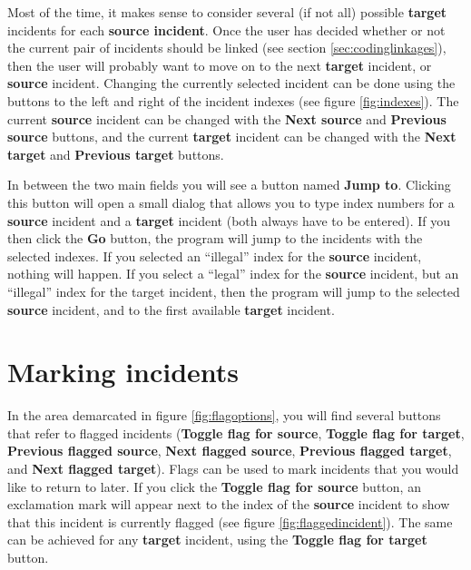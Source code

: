 \documentclass{memoir}
\begin{document}
Most of the time, it makes sense to consider several (if not all) possible \textbf{target} incidents for each \textbf{source incident}. Once the user has decided whether or not the current pair of incidents should be linked (see section \ref{sec:codinglinkages}), then the user will probably want to move on to the next \textbf{target} incident, or \textbf{source} incident. Changing the currently selected incident can be done using the buttons to the left and right of the incident indexes (see figure \ref{fig:indexes}). The current \textbf{source} incident can be changed with the \textbf{Next source} and \textbf{Previous source} buttons, and the current \textbf{target} incident can be changed with the \textbf{Next target} and \textbf{Previous target} buttons.

In between the two main fields you will see a button named \textbf{Jump to}. Clicking this button will open a small dialog that allows you to type index numbers for a \textbf{source} incident and a \textbf{target} incident (both always have to be entered). If you then click the \textbf{Go} button, the program will jump to the incidents with the selected indexes. If you selected an ``illegal'' index for the \textbf{source} incident, nothing will happen. If you select a ``legal'' index for the \textbf{source} incident, but an ``illegal'' index for the target incident, then the program will jump to the selected \textbf{source} incident, and to the first available \textbf{target} incident.

\section{Marking incidents}
\label{sec:markingincidents}

In the area demarcated in figure \ref{fig:flagoptions}, you will find several buttons that refer to flagged incidents (\textbf{Toggle flag for source}, \textbf{Toggle flag for target}, \textbf{Previous flagged source}, \textbf{Next flagged source}, \textbf{Previous flagged target}, and \textbf{Next flagged target}). Flags can be used to mark incidents that you would like to return to later. If you click the \textbf{Toggle flag for source} button, an exclamation mark will appear next to the index of the \textbf{source} incident to show that this incident is currently flagged (see figure \ref{fig:flaggedincident}). The same can be achieved for any \textbf{target} incident, using the \textbf{Toggle flag for target} button.
\end{document}
